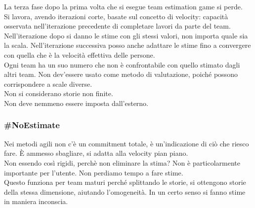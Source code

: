 La terza fase dopo la prima volta che si esegue team estimation game si perde. \\
Si lavora, avendo iterazioni corte, basate sul concetto di velocity: capacità osservata nell'iterazione precedente di completare lavori da parte del team. \\ Nell'iterazione dopo si danno le stime con gli stessi valori, non importa quale sia la scala. Nell'iterazione successiva posso anche adattare le stime fino a convergere con quella che è la velocità effettiva delle persone. \\
Ogni team ha un suo numero che non è confrontabile con quello stimato dagli altri team. Non dev'essere usato come metodo di valutazione, poiché possono corrispondere a scale diverse. \\
Non si considerano storie non finite. \\
Non deve nemmeno essere imposta dall'esterno.


\subsubsection{\#NoEstimate}
Nei metodi agili non c'è un commitment totale, è un'indicazione di ciò che riesco fare. È ammesso sbagliare, si adatta alla velocity pian piano. \\
Non essendo così rigidi, perchè non eliminare la stima? Non è particolarmente importante per l'utente. Non perdiamo tempo a fare stime. \\
Questo funziona per team maturi perché splittando le storie, si ottengono storie della stessa dimensione, aiutando l'omogeneità. In un certo senso si fanno stime in maniera inconscia.